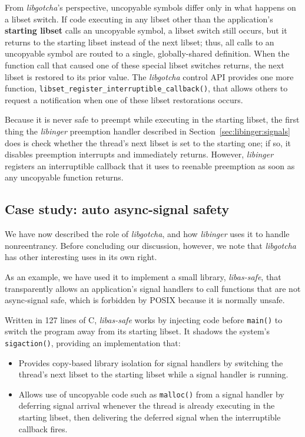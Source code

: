 From \textit{libgotcha}'s perspective, uncopyable symbols differ only in what
happens on a libset switch.  If code executing in any libset other than the
application's \textbf{starting libset} calls an uncopyable symbol, a libset
switch still occurs, but it returns to the starting libset instead of the next
libset; thus, all calls to an uncopyable symbol are routed to a single,
globally-shared definition.  When the function call that caused one of these special
libset switches returns, the next libset is restored to its prior value.  The
\textit{libgotcha} control API provides one more function,
\texttt{libset\_register\_interruptible\_callback()}, that allows others to request
a notification when one of these libset restorations occurs.

Because it is never safe to preempt while executing in the starting libset, the
first thing the \textit{libinger} preemption handler described in
Section~\ref{sec:libinger:signals} does is check whether the thread's next libset
is set to the starting one; if so, it disables preemption interrupts and immediately
returns.  However, \textit{libinger} registers an interruptible callback that it uses
to reenable preemption as soon as any uncopyable function returns.



\subsection{Case study: auto async-signal safety}
\label{sec:assafe}

We have now described the role of \textit{libgotcha}, and how \textit{libinger} uses
it to handle nonreentrancy.  Before concluding our discussion, however, we note that
\textit{libgotcha} has other interesting uses in its own right.

As an example, we have used it to implement a small library, \textit{libas-safe},
that transparently allows an application's signal handlers to call functions that
are not async-signal safe, which is forbidden by POSIX because it is normally unsafe.

Written in 127 lines of C, \textit{libas-safe} works by injecting code before
\texttt{main()} to switch the program away from its starting libset.  It shadows
the system's \texttt{sigaction()}, providing an implementation that:
\begin{itemize}
\item Provides copy-based library isolation for signal handlers by switching the
	thread's next libset to the starting libset while a signal handler is running.
\item Allows use of uncopyable code such as \texttt{malloc()} from a signal
	handler by deferring signal arrival whenever the thread is already executing
	in the starting libset, then delivering the deferred signal when the
	interruptible callback fires.
\end{itemize}

